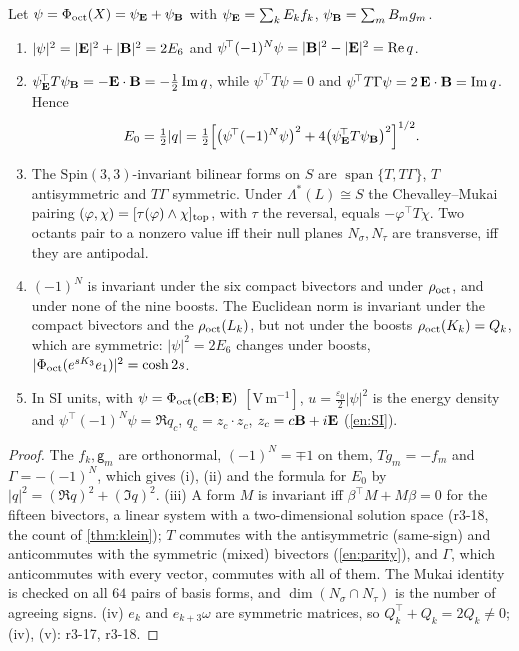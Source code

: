 \begin{proposition}
\label{r3:prop:energies}
Let $\psi=\Phi_{\rm oct}(X)=\psi_{\mathbf E}+\psi_{\mathbf B}$ with $\psi_{\mathbf E}=\sum_kE_kf_k$, $\psi_{\mathbf B}=\sum_mB_mg_m$.
\begin{enumerate}[label=(\roman*),leftmargin=2.2em]
\item $|\psi|^2=|\mathbf E|^2+|\mathbf B|^2=2E_6$ and $\psi^{\!\top}(-1)^N\psi=|\mathbf B|^2-|\mathbf E|^2=\operatorname{Re} q$.
\item $\psi_{\mathbf E}^{\!\top}T\psi_{\mathbf B}=-\mathbf E\cdot\mathbf B=-\tfrac12\operatorname{Im} q$, while $\psi^{\!\top}T\psi=0$ and $\psi^{\!\top}T\Gamma\psi=2\,\mathbf E\cdot\mathbf B=\operatorname{Im} q$. Hence
\[
E_0=\tfrac12|q|=\tfrac12\Bigl[\bigl(\psi^{\!\top}(-1)^N\psi\bigr)^2+4\bigl(\psi_{\mathbf E}^{\!\top}T\psi_{\mathbf B}\bigr)^2\Bigr]^{1/2}.
\]
\item The $\mathrm{Spin}(3,3)$-invariant bilinear forms on $S$ are $\operatorname{span}\{T,T\Gamma\}$, $T$ antisymmetric and $T\Gamma$ symmetric. Under
$\Lambda^*(L)\cong S$ the Chevalley--Mukai pairing $(\varphi,\chi)=[\tau(\varphi)\wedge\chi]_{\rm top}$, with $\tau$ the reversal, equals
$-\varphi^{\!\top}T\chi$. Two octants pair to a nonzero value iff their null planes $N_\sigma,N_\tau$ are transverse, iff they are antipodal.
\item $(-1)^N$ is invariant under the six compact bivectors and under $\rho_{\rm oct}$, and under none of the nine boosts. The Euclidean norm is
invariant under the compact bivectors and the $\rho_{\rm oct}(L_k)$, but not under the boosts $\rho_{\rm oct}(K_k)=Q_k$, which are symmetric:
$|\psi|^2=2E_6$ changes under boosts, $|\Phi_{\rm oct}(e^{sK_3}e_1)|^2=\cosh2s$.
\item In SI units, with $\psi=\Phi_{\rm oct}(c\mathbf B;\mathbf E)$ $[\mathrm{V\,m^{-1}}]$, $u=\tfrac{\varepsilon_0}2|\psi|^2$ is the energy density and
$\psi^{\!\top}(-1)^N\psi=\Re q_c$, $q_c=z_c\cdot z_c$, $z_c=c\mathbf B+i\mathbf E$ (\cref{en:SI}).
\end{enumerate}
\end{proposition}

\begin{proof}
The $f_k,\mathsf g_m$ are orthonormal, $(-1)^N=\mp1$ on them, $Tg_m=-f_m$ and $\Gamma=-(-1)^N$, which gives (i), (ii) and the formula for $E_0$ by
$|q|^2=(\Re q)^2+(\Im q)^2$. (iii) A form $M$ is invariant iff $\beta^{\!\top}M+M\beta=0$ for the fifteen bivectors, a linear system with a
two-dimensional solution space (r3-18, the count of \cref{thm:klein}); $T$ commutes with the antisymmetric (same-sign) and
anticommutes with the symmetric (mixed) bivectors (\cref{en:parity}), and $\Gamma$, which anticommutes with every vector, commutes
with all of them. The Mukai identity is checked on all $64$ pairs of basis forms, and $\dim(N_\sigma\cap N_\tau)$ is the number of agreeing signs.
(iv) $e_k$ and $e_{k+3}\omega$ are symmetric matrices, so $Q_k^{\!\top}+Q_k=2Q_k\neq0$; (iv), (v): r3-17, r3-18.
\end{proof}

